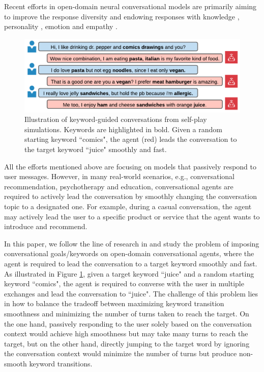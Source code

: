 \documentclass[letterpaper]{article} %
\begin{document}
Recent efforts in open-domain neural conversational models are primarily aiming to improve the response diversity \cite{li2016simple, zhang2018generating} and endowing responses with knowledge \cite{zhou2018commonsense, dinan2018wizard}, personality \cite{li2016persona, zhang2018personalizing}, emotion \cite{zhou2018emotional, zhong2019affect} and empathy \cite{rashkin2019towards, zhong2020towards}.
\begin{figure}[!t]
\centering
\includegraphics[width=1\linewidth]{images/example_conversation_v2.pdf}
\caption{Illustration of keyword-guided conversations from self-play simulations. Keywords are highlighted in bold. Given a random starting keyword ``comics", the agent (red) leads the conversation to the target keyword ``juice" smoothly and fast.}
\label{fig: example conversation}
\end{figure}
All the efforts mentioned above are focusing on models that passively respond to user messages. However, in many real-world scenarios, e.g., conversational recommendation, psychotherapy and education, conversational agents are required to actively lead the conversation by smoothly changing the conversation topic to a designated one. For example, during a casual conversation, the agent may actively lead the user to a specific product or service that the agent wants to introduce and recommend.

In this paper, we follow the line of research in \cite{tang2019target, qin2020dynamic} and study the problem of imposing conversational goals/keywords on open-domain conversational agents, where the agent is required to lead the conversation to a target keyword smoothly and fast. As illustrated in Figure \ref{fig: example conversation}, given a target keyword ``juice" and a random starting keyword ``comics", the agent is required to converse with the user in multiple exchanges and lead the conversation to ``juice". The challenge of this problem lies in how to balance the tradeoff between maximizing keyword transition smoothness and minimizing the number of turns taken to reach the target. On the one hand, passively responding to the user solely based on the conversation context would achieve high smoothness but may take many turns to reach the target, but on the other hand, directly jumping to the target word by ignoring the conversation context would minimize the number of turns but produce non-smooth keyword transitions.
\end{document}
